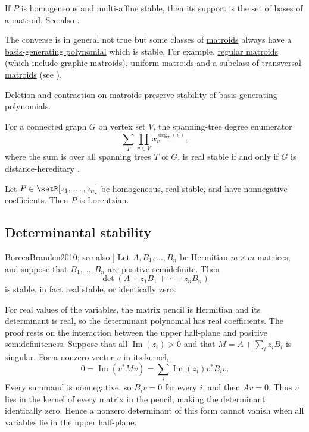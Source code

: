 \begin{theorem}
If $P$ is homogeneous and multi-affine stable,
then its support is the set of bases of a \hyperref[matroid]{matroid}.
See also \cite[Cor. 3.4]{Branden2007}.
\end{theorem}
The converse is in general not true but some classes of \hyperref[matroid]{matroids}
always have a \hyperref[basisGeneratingPolynomial]{basis-generating polynomial}
which is stable.
For example, \hyperref[matroidRegular]{regular matroids}
(which include \hyperref[matroidGraphic]{graphic matroids}),
\hyperref[matroidUniform]{uniform matroids} and
a subclass of \hyperref[transversalMatroids]{transversal matroids}
(see \cite{ChoeOxleySokalWagner2004}).


\hyperref[matroidOperations]{Deletion and contraction} on matroids preserve
stability of basis-generating polynomials.

For a connected graph $G$ on vertex set $V$, the spanning-tree degree
enumerator
\[
  \sum_T \prod_{v \in V} x_v^{\deg_T(v)},
\]
where the sum is over all spanning trees $T$ of $G$, is real stable if and
only if $G$ is distance-hereditary \cite{CherkashinPetrovProzorov2023}.


\begin{theorem}
Let $P \in \setR[z_1,\dotsc,z_n]$ be homogeneous, real stable, and have
nonnegative coefficients.  Then $P$ is \hyperref[lorentzianPolynomial]{Lorentzian}.
\end{theorem}


\subsection[determinantalStability]{Determinantal stability}

\begin{theorem}[Borcea--Brändén,
\cite[Prop.~1.12]{BorceaBranden2010}; see also
\cite[Prop.~2.4]{BorceaBranden2008MixedDeterminants}]
Let $A,B_1,\dotsc,B_n$ be Hermitian $m\times m$ matrices, and suppose that
$B_1,\dotsc,B_n$ are positive semidefinite.  Then
\[
 \det(A+z_1B_1+\dotsb+z_nB_n)
\]
is stable, in fact real stable, or identically zero.
\end{theorem}

For real values of the variables, the matrix pencil is Hermitian and its
determinant is real, so the determinant polynomial has real coefficients.
The proof rests on the interaction between the upper half-plane and positive
semidefiniteness.  Suppose that all $\operatorname{Im}(z_i)>0$ and that
$M=A+\sum_i z_iB_i$ is singular.  For a nonzero vector $v$ in its kernel,
\[
 0=\operatorname{Im}(v^*Mv)
  =\sum_i \operatorname{Im}(z_i)v^*B_iv.
\]
Every summand is nonnegative, so $B_iv=0$ for every $i$, and then $Av=0$.
Thus $v$ lies in the kernel of every matrix in the pencil, making the
determinant identically zero.  Hence a nonzero determinant of this form cannot
vanish when all variables lie in the upper half-plane.


